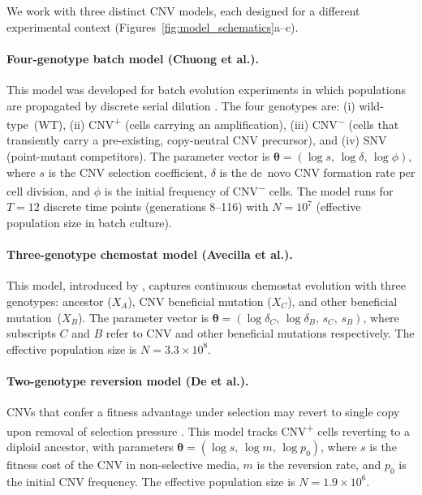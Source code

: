 \documentclass[11pt]{article}
\newcommand{\btheta}{\boldsymbol{\theta}}
\begin{document}
We work with three distinct CNV models, each designed for a different
experimental context (Figures~\ref{fig:model_schematics}a--c).

\paragraph{Four-genotype batch model (Chuong et al.).}
This model was developed for batch evolution experiments in which populations
are propagated by discrete serial dilution \citep{chuong2025template}.
The four genotypes are: (i) wild-type~(WT), (ii) CNV\textsuperscript{+}
(cells carrying an amplification), (iii) CNV\textsuperscript{$-$} (cells
that transiently carry a pre-existing, copy-neutral CNV precursor), and
(iv) SNV (point-mutant competitors).
The parameter vector is
$\btheta = (\log s,\, \log \delta,\, \log \phi)$, where $s$ is the CNV
selection coefficient, $\delta$ is the de~novo CNV formation rate per cell
division, and $\phi$ is the initial frequency of CNV\textsuperscript{$-$}
cells.
The model runs for $T=12$ discrete time points (generations 8--116) with
$N = 10^7$ (effective population size in batch culture).

\paragraph{Three-genotype chemostat model (Avecilla et al.).}
This model, introduced by \citet{avecilla2022neural}, captures continuous
chemostat evolution with three genotypes: ancestor ($X_A$), CNV beneficial
mutation ($X_C$), and other beneficial mutation~($X_B$).
The parameter vector is
$\btheta = (\log\delta_C,\, \log\delta_B,\, s_C,\, s_B)$, where subscripts
$C$ and $B$ refer to CNV and other beneficial mutations respectively.
The effective population size is $N = 3.3\times10^8$.

\paragraph{Two-genotype reversion model (De et al.).}
CNVs that confer a fitness advantage under selection may revert to single copy
upon removal of selection pressure \citep{de2025segmental}.
This model tracks CNV\textsuperscript{+} cells reverting to a diploid
ancestor, with parameters
$\btheta = (\log s,\, \log m,\, \log p_0)$, where $s$ is the fitness cost of
the CNV in non-selective media, $m$ is the reversion rate, and $p_0$ is the
initial CNV frequency.
The effective population size is $N = 1.9\times10^6$.
\end{document}
